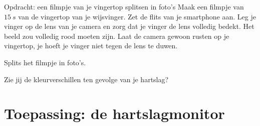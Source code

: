 \begin{opdracht}{Opdracht: een filmpje van je vingertop splitsen in foto's}
	Maak een filmpje van $15~s$ van de vingertop van je wijsvinger. Zet de flits van je smartphone aan. Leg je vinger op de lens van je camera en zorg dat je vinger de lens volledig bedekt. Het beeld zou volledig rood moeten zijn. Laat de camera gewoon rusten op je vingertop, je hoeft je vinger niet tegen de lens te duwen. 
	
	Splits het filmpje in foto's. 
	
	Zie jij de kleurverschillen ten gevolge van je hartslag?
	
	\opdrachteindbalk
\end{opdracht}


\section{Toepassing: de hartslagmonitor}
\label{sec:Mod3_Sec3}
%

